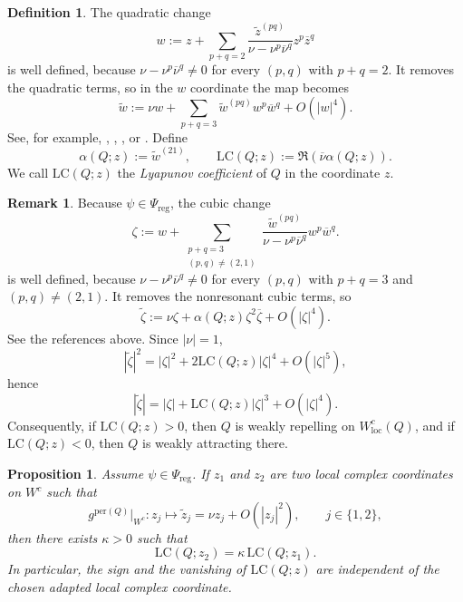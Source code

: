 \documentclass[11pt,a4paper]{article}
\theoremstyle{plain}
\newtheorem{proposition}[theorem]{Proposition}%
\theoremstyle{definition}
\newtheorem{definition}[theorem]{Definition}
\newtheorem{remark}[theorem]{Remark}
\theoremstyle{plain}
\numberwithin{equation}{section}
\begin{document}
\begin{definition}
\label{def-LC}
The quadratic change
\[
w
:=
z
+
\sum_{p+q=2}
\frac{\widetilde{z}^{(pq)}}{\nu - \nu^p \overline\nu^q}
z^p \overline z^q
\]
is well defined, because $\nu - \nu^p \overline\nu^q \neq 0$ for every $(p,q)$ with $p+q=2$. It removes the quadratic terms, so in the $w$ coordinate the map becomes
\[
\widetilde{w}
:=
\nu w
+
\sum_{p+q=3}
\widetilde{w}^{(pq)} w^p \overline w^q
+
O(|w|^4).
\]
See, for example, \cite[Sections~7, 8]{RT1971}, \cite[Chapter~III]{Iooss1979}, \cite[Sections~6, 6A]{MarsdenMcCracken1976}, or \cite[Section~2.8]{Devaney2003}.
Define
\[
\alpha(Q;z) := \widetilde{w}^{(21)},
\qquad
\mathrm{LC}(Q;z) := \Re(\overline\nu \alpha(Q;z)).
\]
We call $\mathrm{LC}(Q;z)$ the \emph{Lyapunov coefficient} of $Q$ in the coordinate $z$.
\end{definition}

\begin{remark}\label{prop-LC-sign}
Because $\psi \in \Psi_\mathrm{reg}$, the cubic change
\[
\zeta
:=
w
+
\sum_{\substack{p+q=3\\(p,q)\neq (2,1)}}
\frac{\widetilde{w}^{(pq)}}{\nu - \nu^p \overline\nu^q}
w^p \overline w^q.
\]
is well defined, because $\nu - \nu^p \overline\nu^q \neq 0$ for every $(p,q)$ with $p+q=3$ and $(p,q)\neq(2,1)$. It removes the nonresonant cubic terms, so
\[
\widetilde{\zeta}
:=
\nu \zeta + \alpha(Q;z)\zeta^2 \overline\zeta + O(|\zeta|^4).
\]
See the references above. Since $|\nu| = 1$,
\[
|\widetilde{\zeta}|^2
=
|\zeta|^2 + 2\mathrm{LC}(Q;z)|\zeta|^4 + O(|\zeta|^5),
\]
hence
\[
|\widetilde{\zeta}|
=
|\zeta| + \mathrm{LC}(Q;z)|\zeta|^3 + O(|\zeta|^4).
\]
Consequently, if $\mathrm{LC}(Q;z) > 0$, then $Q$ is weakly repelling on $W^c_\mathrm{loc}(Q)$, and if $\mathrm{LC}(Q;z) < 0$, then $Q$ is weakly attracting there.
\end{remark}

\begin{proposition}
\label{prop-LC-coordinate-free}
Assume $\psi \in \Psi_\mathrm{reg}$. If $z_1$ and $z_2$ are two local complex coordinates on $W^c$ such that
\[
g^{\mathrm{per}(Q)}|_{W^c} : z_j \longmapsto \widetilde{z}_j = \nu z_j + O(|z_j|^2),
\qquad
j \in \{1,2\},
\]
then there exists $\kappa > 0$ such that
\[
\mathrm{LC}(Q;z_2) = \kappa \, \mathrm{LC}(Q;z_1).
\]
In particular, the sign and the vanishing of $\mathrm{LC}(Q;z)$ are independent of the chosen adapted local complex coordinate.
\end{proposition}
\end{document}
